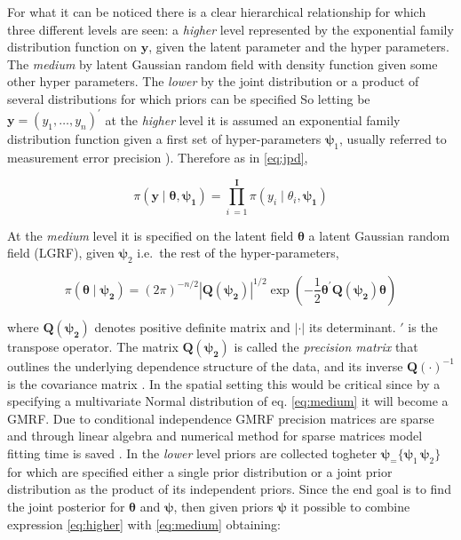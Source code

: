 \documentclass[
  12pt,
  a4paper,
  oneside]{book}
\theoremstyle{definition}
\theoremstyle{definition}
\theoremstyle{definition}
\theoremstyle{remark}
\begin{document}
For what it can be noticed there is a clear hierarchical relationship for which three different levels are seen: a \emph{higher} level represented by the exponential family distribution function on \(\mathbf{y}\), given the latent parameter and the hyper parameters. The \emph{medium} by latent Gaussian random field with density function given some other hyper parameters. The \emph{lower} by the joint distribution or a product of several distributions for which priors can be specified
So letting be \(\boldsymbol{\mathbf{y}}=\left(y_{1}, \ldots, y_{n}\right)^{\prime}\) at the \emph{higher} level it is assumed an exponential family distribution function given a first set of hyper-parameters \(\boldsymbol\psi_1\), usually referred to measurement error precision \citet{Blangiardo-Cameletti}). Therefore as in \eqref{eq:jpd},

\begin{equation}
  \pi(\boldsymbol{\mathbf{y}} \mid \boldsymbol{\theta}, \boldsymbol{\psi_1})=\prod_{i\ = 1}^{\mathbf{I}} \pi\left(y_{i} \mid \theta_{i}, \boldsymbol{\psi_1}\right)
\label{eq:higher}
\end{equation}

At the \emph{medium} level it is specified on the latent field \(\boldsymbol\theta\) a latent Gaussian random field (LGRF), given \(\boldsymbol\psi_2\) i.e.~the rest of the hyper-parameters,

\begin{equation}
  \pi(\boldsymbol{\theta} \mid \boldsymbol{\psi_2})=(2 \pi)^{-n / 2}| \boldsymbol{Q(\psi_2)}|^{1 / 2} \exp \left(-\frac{1}{2} \boldsymbol{\theta}^{\prime} \boldsymbol{Q(\psi_2)} \boldsymbol{\theta}\right)
\label{eq:medium}
\end{equation}

where \(\boldsymbol{Q(\psi_2)}\) denotes positive definite matrix and \(|\cdot|\) its determinant. \(\prime\) is the transpose operator. The matrix \(\boldsymbol{Q(\psi_2)}\) is called the \emph{precision matrix} that outlines the underlying dependence structure of the data, and its inverse \(\boldsymbol{Q(\cdot)}^{-1}\) is the covariance matrix \citep{wang2018bayesian}. In the spatial setting this would be critical since by a specifying a multivariate Normal distribution of eq. \eqref{eq:medium} it will become a GMRF. Due to conditional independence GMRF precision matrices are sparse and through linear algebra and numerical method for sparse matrices model fitting time is saved \citep{GMRFRue}.
In the \emph{lower} level priors are collected togheter \(\boldsymbol\psi_ =\{ \boldsymbol\psi_1\, \boldsymbol\psi_2\}\) for which are specified either a single prior distribution or a joint prior distribution as the product of its independent priors.
Since the end goal is to find the joint posterior for \(\boldsymbol\theta\) and \(\boldsymbol\psi\), then given priors \(\boldsymbol\psi\) it possible to combine expression \eqref{eq:higher} with \eqref{eq:medium} obtaining:
\end{document}
